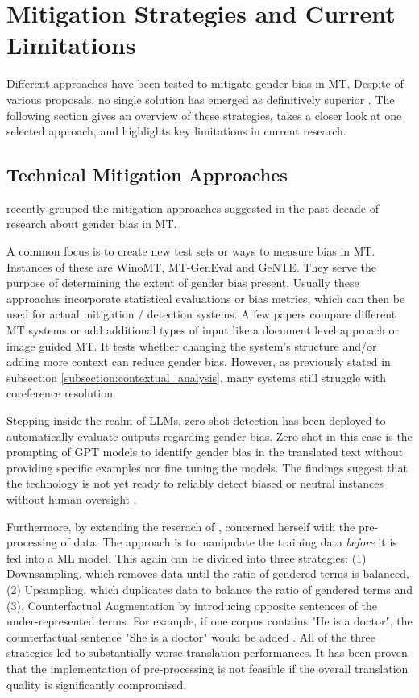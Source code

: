 \section{Mitigation Strategies and Current Limitations}    

Different approaches have been tested to mitigate gender bias in MT. Despite of various proposals, no single solution has emerged as definitively superior \citep{savoldiDecadeGenderBias2025}. The following section gives an overview of these strategies, takes a closer look at one selected approach, and highlights key limitations in current research.

\subsection{Technical Mitigation Approaches}
\citet{savoldiDecadeGenderBias2025} recently grouped the mitigation approaches suggested in the past decade of research about gender bias in MT. 

A common focus is to create new test sets or ways to measure bias in MT. Instances of these are WinoMT, MT-GenEval and GeNTE. They serve the purpose of determining the extent of gender bias present. Usually these approaches incorporate statistical evaluations or bias metrics, which can then be used for actual mitigation / detection systems. A few papers compare different MT systems or add additional types of input like a document level approach or image guided MT. It tests whether changing the system's structure and/or adding more context can reduce gender bias. However, as previously stated in subsection \ref{subsection:contextual_analysis}, many systems still struggle with coreference resolution.

Stepping inside the realm of LLMs, zero-shot detection has been deployed to automatically evaluate outputs regarding gender bias. Zero-shot in this case is the prompting of GPT models to identify gender bias in the translated text without providing specific examples nor fine tuning the models. The findings suggest that the technology is not yet ready to reliably detect biased or neutral instances without human oversight \citep{lardelliBuildingBridgesDataset2024}. 

Furthermore, by extending the reserach of \citet{tomalinPracticalEthicsBias2021}, \citet{ullmannGenderBiasMachine2022} concerned herself with the pre-processing of data. The approach is to manipulate the training data \textit{before} it is fed into a ML model. This again can be divided into three strategies: (1) Downsampling, which removes data until the ratio of gendered terms is balanced, (2) Upsampling, which duplicates data to balance the ratio of gendered terms and (3), Counterfactual Augmentation by introducing opposite sentences of the under-represented terms. For example, if one corpus contains "He is a doctor", the counterfactual sentence "She is a doctor" would be added \citep{ullmannGenderBiasMachine2022}. All of the three strategies led to substantially worse translation performances. It has been proven that the implementation of pre-processing is not feasible if the overall translation quality is significantly compromised.

